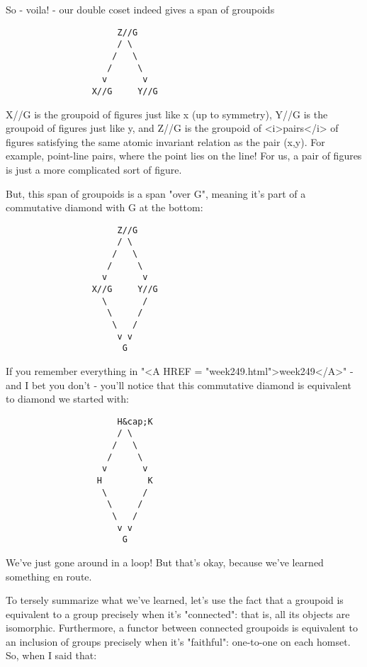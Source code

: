So - voila! - our double coset indeed gives a span of groupoids

\begin{verbatim}
                      Z//G
                      / \
                     /   \
                    /     \
                   v       v
                 X//G     Y//G
\end{verbatim}
    

X//G is the groupoid of figures just like x (up to symmetry), Y//G
is the groupoid of figures just like y, and Z//G is the groupoid of 
<i>pairs</i> of figures satisfying the same atomic invariant relation
as the pair (x,y).  For example, point-line pairs, where the point
lies on the line!  For us, a pair of figures is just a more complicated
sort of figure.

But, this span of groupoids is a span "over G", meaning it's
part of a commutative diamond with G at the bottom:

\begin{verbatim}
                      Z//G
                      / \
                     /   \
                    /     \
                   v       v
                 X//G     Y//G
                   \       /
                    \     /
                     \   /
                      v v
                       G
\end{verbatim}
    

If you remember everything in "<A HREF =
"week249.html">week249</A>" - and I bet you don't - you'll notice
that this commutative diamond is equivalent to diamond we started
with:

\begin{verbatim}
                      H&cap;K
                      / \
                     /   \
                    /     \
                   v       v
                  H         K
                   \       /
                    \     /
                     \   /
                      v v
                       G
\end{verbatim}
    
We've just gone around in a loop!  But that's okay, because we've
learned something en route.

To tersely summarize what we've learned, let's use the fact that a 
groupoid is equivalent to a group precisely when it's "connected":
that is, all its objects are isomorphic.  Furthermore, a functor between 
connected groupoids is equivalent to an inclusion of groups precisely 
when it's "faithful": one-to-one on each homset.  So, when I said that:

